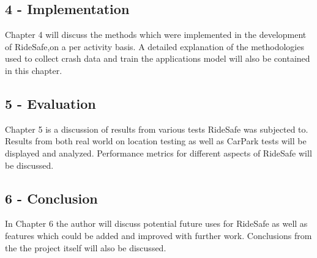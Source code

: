 \subsection* {4 - Implementation}
Chapter 4 will discuss the methods which were implemented in the development of RideSafe,on a per activity basis. A detailed explanation of the methodologies used to collect crash data and train the applications model will also be contained in this chapter. 


\subsection* {5 - Evaluation}


Chapter 5 is a discussion of results from various tests RideSafe was subjected to. Results from both real world on location testing as well as CarPark tests will be displayed and analyzed. Performance metrics for different aspects of RideSafe will be discussed. 



\subsection* {6 - Conclusion}

In Chapter 6 the author will discuss potential future uses for RideSafe as well as features which could be added and improved with further work. Conclusions from the the project itself will also be discussed.



